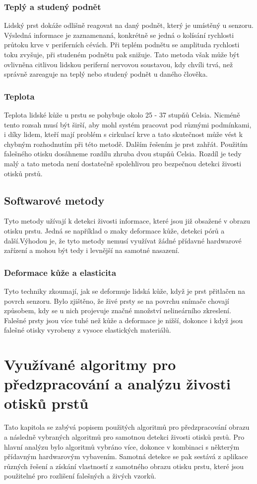 \subsection{Teplý a studený podnět}
Lidský prst dokáže odlišně reagovat na daný podnět, který je umístěný u senzoru. Výsledná informace je zaznamenaná, konkrétně se jedná o kolísání rychlosti průtoku krve v periferních cévách. Při teplém podnětu se amplituda rychlosti toku zvyšuje, při studeném podnětu pak snižuje. Tato metoda však může být ovlivněna citlivou lidskou periferní nervovou soustavou, kdy chvíli trvá, než správně zareaguje na teplý nebo studený podnět u daného člověka.\cite{AdvancedBiometricsTechnologies2011}
\subsection{Teplota}
Teplota lidské kůže u prstu se pohybuje okolo 25 - 37 stupňů Celsia. Nicméně tento rozsah musí být širší, aby mohl systém pracovat pod různými podmínkami, i díky lidem, kteří mají problém s cirkulací krve a tato skutečnost může vést k chybným rozhodnutím při této metodě. Dalším řešením je prst zahřát. Použitím falešného otisku dosáhneme rozdílu zhruba dvou stupňů Celsia. Rozdíl je tedy malý a tato metoda není dostatečně spolehlivou pro bezpečnou detekci živosti otisků prstů.\cite{AdvancedBiometricsTechnologies2011}

\section{Softwarové metody}
Tyto metody užívají k detekci živosti informace, které jsou již obsažené v obrazu otisku prstu. Jedná se například o znaky deformace kůže, detekci pórů a další.Výhodou je, že tyto metody nemusí využívat žádné přídavné hardwarové zařízení a mohou být tedy i levnější na samotné nasazení.

\subsection{Deformace kůže a elasticita}
Tyto techniky zkoumají, jak se deformuje lidská kůže, když je prst přitlačen na povrch senzoru. Bylo zjištěno, že živé prsty se na povrchu snímače chovají způsobem, kdy se u nich projevuje značné množství nelineárního zkreslení. Falešné prsty jsou více tuhé než kůže a deformace je nižší, dokonce i když jsou falešné otisky vyrobeny z vysoce elastických materiálů.\cite{BiometricsEncyclopedia2009}

\chapter{Využívané algoritmy pro předzpracování a analýzu živosti otisků prstů}
Tato kapitola se zabývá popisem použitých algoritmů pro předzpracování obrazu a následně vybraných algoritmů pro samotnou detekci živosti otisků prstů. Pro hlavní analýzu bylo algoritmů vybráno více, dokonce v kombinaci s některým přídavným hardwarovým vybavením. Samotná detekce se pak sestává z aplikace různých řešení a získání vlastností z samotného obrazu otisku prstu, které jsou použitelné pro rozlišení falešných a živých vzorků.
